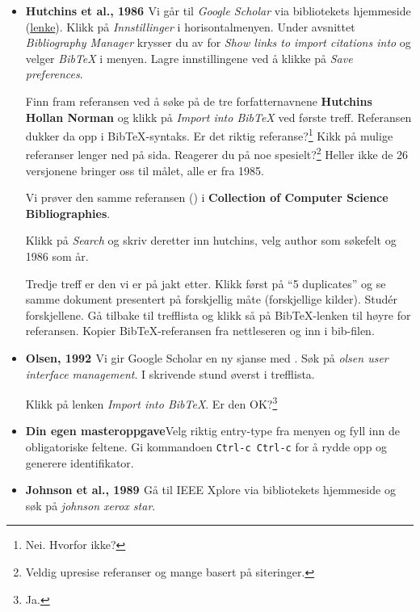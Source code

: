 \documentclass[11pt,norsk,a4paper]{article}
\newcommand{\kdo}[1]{\texttt{#1}}
\newcommand{\bt}{BibTeX{}}
\begin{document}
\begin{itemize}

\item\textbf{Hutchins et al., 1986 \cite{hutchins1986}}\newline Vi går
  til \textit{Google Scholar} via bibliotekets hjemmeside (\href{https://www.ub.uio.no/informatikk}{lenke}). Klikk på
  \textit{Innstillinger} i horisontalmenyen. Under avsnittet
  \textit{Bibliography Manager} krysser du av for \textit{Show links
    to import citations into} og velger \textit{BibTeX} i
  menyen. Lagre innstillingene ved å klikke på \textit{Save
    preferences}.

  Finn fram referansen ved å søke på de tre forfatternavnene
  \textbf{Hutchins Hollan Norman} og klikk på \textit{Import into BibTeX}
  ved første treff. Referansen dukker da opp i BibTeX-syntaks. Er det
  riktig referanse?\footnote{Nei. Hvorfor ikke?} Kikk på mulige
  referanser lenger ned på sida. Reagerer du på noe
  spesielt?\footnote{Veldig upresise referanser og mange basert på
    siteringer.} Heller ikke de 26 versjonene bringer oss til målet, alle er fra 1985.

  Vi prøver den samme referansen (\cite{hutchins1986}) i
  \textbf{Collection of Computer Science Bibliographies}\cite{achilles}.

Klikk på \textit{Search} og skriv deretter inn hutchins, velg author
som søkefelt og 1986 som år.

Tredje treff er den vi er på jakt etter. Klikk først på ``5
duplicates'' og se samme dokument presentert på forskjellig måte
(forskjellige kilder). Studér forskjellene. Gå tilbake til trefflista
og klikk så på \bt-lenken til høyre
for referansen. Kopier \bt-referansen fra nettleseren og inn i
bib-filen.

\item\textbf{Olsen, 1992 \cite{olsen1992}}\newline Vi gir Google
  Scholar en ny sjanse med \cite{olsen1992}.  Søk på \textit{olsen
    user interface management}. I skrivende stund øverst i trefflista.

Klikk på lenken \textit{Import into \bt}. Er den OK?\footnote{Ja.}

\item\textbf{Din egen masteroppgave}\newline Velg riktig entry-type fra
  menyen og fyll inn de obligatoriske feltene. Gi kommandoen
  \kdo{Ctrl-c Ctrl-c} for å rydde opp og generere identifikator.

\item\textbf{Johnson et al., 1989 \cite{johnson1989}}\newline 
Gå til IEEE Xplore via bibliotekets hjemmeside og søk på \textit{johnson
xerox star}. 


\end{itemize}
\end{document}
